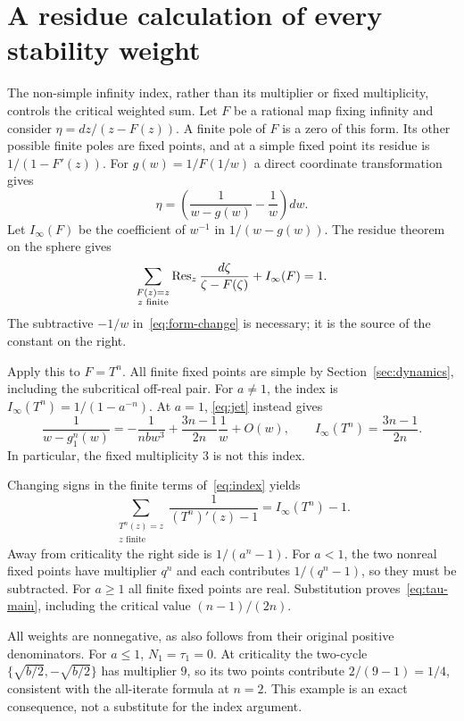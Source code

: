 \section{A residue calculation of every stability weight}\label{sec:indices}

The non-simple infinity index, rather than its multiplier or fixed
multiplicity, controls the critical weighted sum. Let $F$ be a rational map
fixing infinity and consider $\eta=dz/(z-F(z))$. A finite pole of $F$ is a
zero of this form. Its other possible finite poles are fixed points, and at a
simple fixed point its residue is $1/(1-F'(z))$. For
$g(w)=1/F(1/w)$ a direct coordinate transformation gives
\begin{equation}\label{eq:form-change}
 \eta=\left(\frac1{w-g(w)}-\frac1w\right)dw.
\end{equation}
Let $I_\infty(F)$ be the coefficient of $w^{-1}$ in $1/(w-g(w))$. The
residue theorem on the sphere gives
\begin{equation}\label{eq:index}
 \sum_{\substack{F(z)=z\\z\text{ finite}}}
 \operatorname{Res}_z\frac{d\zeta}{\zeta-F(\zeta)}+I_\infty(F)=1.
\end{equation}
The subtractive $-1/w$ in~\eqref{eq:form-change} is necessary; it is the source
of the constant on the right.

Apply this to $F=T^n$. All finite fixed points are simple by
Section~\ref{sec:dynamics}, including the subcritical off-real pair. For
$a\ne1$, the index is $I_\infty(T^n)=1/(1-a^{-n})$. At $a=1$,
\eqref{eq:jet} instead gives
\begin{equation}\label{eq:critical-index}
 \frac1{w-g_1^n(w)}=-\frac1{nbw^3}
   +\frac{3n-1}{2n}\frac1w+O(w),\qquad
 I_\infty(T^n)=\frac{3n-1}{2n}.
\end{equation}
In particular, the fixed multiplicity $3$ is not this index.

Changing signs in the finite terms of~\eqref{eq:index} yields
\begin{equation}\label{eq:finite-sum}
 \sum_{\substack{T^n(z)=z\\z\text{ finite}}}
 \frac1{(T^n)'(z)-1}=I_\infty(T^n)-1.
\end{equation}
Away from criticality the right side is $1/(a^n-1)$. For $a<1$, the two
nonreal fixed points have multiplier $q^n$ and each contributes
$1/(q^n-1)$, so they must be subtracted. For $a\ge1$ all finite fixed points
are real. Substitution proves~\eqref{eq:tau-main}, including the critical value
$(n-1)/(2n)$.

All weights are nonnegative, as also follows from their original positive
denominators. For $a\le1$, $N_1=\tau_1=0$. At criticality the two-cycle
$\{\sqrt{b/2},-\sqrt{b/2}\}$ has multiplier $9$, so its two points contribute
$2/(9-1)=1/4$, consistent with the all-iterate formula at $n=2$. This example
is an exact consequence, not a substitute for the index argument.
